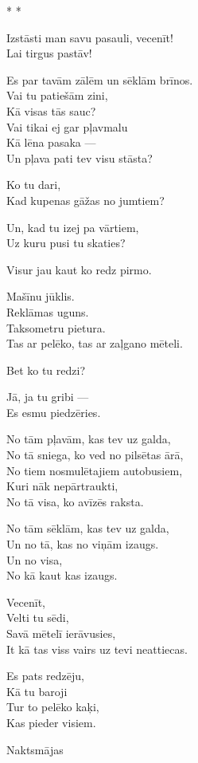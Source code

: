 \documentclass[14pt]{extarticle}
\begin{document}
{\large \sc * * *}

Izstāsti man savu pasauli, vecenīt!\\
Lai tirgus pastāv!

Es par tavām zālēm un sēklām brīnos.\\
Vai tu patiešām zini,\\
Kā visas tās sauc?\\
Vai tikai ej gar pļavmalu\\
Kā lēna pasaka ---\\
Un pļava pati tev visu stāsta?

Ko tu dari,\\
Kad kupenas gāžas no jumtiem?

Un, kad tu izej pa vārtiem,\\
Uz kuru pusi tu skaties?

Visur jau kaut ko redz pirmo.

Mašīnu jūklis.\\
Reklāmas uguns.\\
Taksometru pietura.\\
Tas ar pelēko, tas ar zaļgano mēteli.

Bet ko tu redzi?

Jā, ja tu gribi ---\\
Es esmu piedzēries.

No tām pļavām, kas tev uz galda,\\
No tā sniega, ko ved no pilsētas ārā,\\
No tiem nosmulētajiem autobusiem,\\
Kuri nāk nepārtraukti,\\
No tā visa, ko avīzēs raksta.

No tām sēklām, kas tev uz galda,\\
Un no tā, kas no viņām izaugs.\\
Un no visa,\\
No kā kaut kas izaugs.

Vecenīt,\\
Velti tu sēdi,\\
Savā mētelī ierāvusies,\\
It kā tas viss vairs uz tevi neattiecas.

Es pats redzēju,\\
Kā tu baroji\\
Tur to pelēko kaķi,\\
Kas pieder visiem.


\newpage

{\large \sc Naktsmājas}
\end{document}
